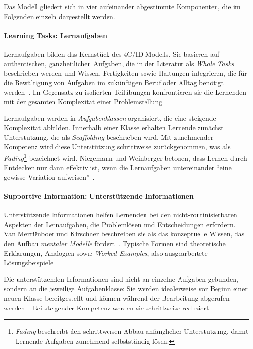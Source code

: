 Das Modell gliedert sich in vier aufeinander abgestimmte Komponenten, die im Folgenden einzeln dargestellt werden.

\paragraph{Learning Tasks: Lernaufgaben}

Lernaufgaben bilden das Kernstück des 4C/ID-Modells. Sie basieren auf authentischen, ganzheitlichen Aufgaben, die in der Literatur als \textit{Whole Tasks} beschrieben werden und Wissen, Fertigkeiten sowie Haltungen integrieren, die für die Bewältigung von Aufgaben im zukünftigen Beruf oder Alltag benötigt werden~\cite{niegemann2020}. Im Gegensatz zu isolierten Teilübungen konfrontieren sie die Lernenden mit der gesamten Komplexität einer Problemstellung.

Lernaufgaben werden in \textit{Aufgabenklassen} organisiert, die eine steigende Komplexität abbilden. Innerhalb einer Klasse erhalten Lernende zunächst Unterstützung, die als \textit{Scaffolding} beschrieben wird. Mit zunehmender Kompetenz wird diese Unterstützung schrittweise zurückgenommen, was als \textit{Fading}\footnote{\textit{Fading} beschreibt den schrittweisen Abbau anfänglicher Unterstützung, damit Lernende Aufgaben zunehmend selbstständig lösen.} bezeichnet wird. Niegemann und Weinberger betonen, dass Lernen durch Entdecken nur dann effektiv ist, wenn die Lernaufgaben untereinander \enquote{eine gewisse Variation aufweisen}~\cite{niegemann2020}.

\paragraph{Supportive Information: Unterstützende Informationen}

Unterstützende Informationen helfen Lernenden bei den nicht-routinisierbaren Aspekten der Lernaufgaben, die Problemlösen und Entscheidungen erfordern. Van Merriënboer und Kirschner beschreiben sie als das konzeptuelle Wissen, das den Aufbau \textit{mentaler Modelle} fördert~\cite{vanmerrienboer2018}. Typische Formen sind theoretische Erklärungen, Analogien sowie \textit{Worked Examples}, also ausgearbeitete Lösungsbeispiele.

Die unterstützenden Informationen sind nicht an einzelne Aufgaben gebunden, sondern an die jeweilige Aufgabenklasse: Sie werden idealerweise vor Beginn einer neuen Klasse bereitgestellt und können während der Bearbeitung abgerufen werden~\cite{niegemann2020}. Bei steigender Kompetenz werden sie schrittweise reduziert.

